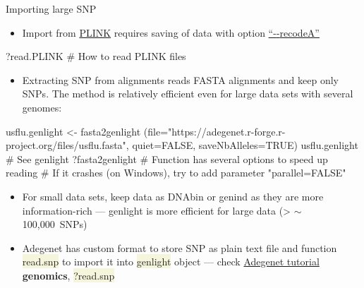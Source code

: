 \documentclass[compress, xelatex, 11pt, xcolor=svgnames, aspectratio=169,
	hyperref={
		bookmarks=true,
		unicode=true,
		colorlinks=true,
		pdftitle={Molecular data in R},
		plainpages=false,
		pdfauthor={Vojtech Zeisek},
		pdfsubject={Course about phylogeny and evolution in R},
		pdfcreator={XeLaTeX},
		pdfkeywords={R, evolution, phylogeny, molecular data},
		linkcolor=Crimson, %
		anchorcolor=Magenta, %
		citecolor=Magenta, %
		filecolor=Magenta, %
		menucolor=Magenta, %
		urlcolor=DodgerBlue, %
		},
	url={hyphens, lowtilde} %
	]{beamer}
\renewcommand{\texttt}[1]{\colorbox{Beige}{{\ttfamily #1}}}
\begin{document}
\begin{frame}[fragile]{Importing large SNP}
	\begin{itemize}
		\item Import from \href{https://zzz.bwh.harvard.edu/plink/index.shtml}{PLINK} requires saving of data with option \href{https://zzz.bwh.harvard.edu/plink/dataman.shtml}{\enquote{-{-}recodeA}}
	\end{itemize}
	\begin{spluscode}
    ?read.PLINK # How to read PLINK files
	\end{spluscode}
	\begin{itemize}
		\item Extracting SNP from alignments reads FASTA alignments and keep only SNPs. The method is relatively efficient even for large data sets with several genomes:
	\end{itemize}
	\begin{spluscode}
    usflu.genlight <- fasta2genlight
      (file="https://adegenet.r-forge.r-project.org/files/usflu.fasta",
      quiet=FALSE, saveNbAlleles=TRUE)
    usflu.genlight # See genlight
    ?fasta2genlight # Function has several options to speed up reading
    # If it crashes (on Windows), try to add parameter "parallel=FALSE"
	\end{spluscode}
	\begin{itemize}
		\item For small data sets, keep data as DNAbin or genind as they are more information-rich --- genlight is more efficient for large data (> $\sim$100,000~SNPs)
		\item Adegenet has custom format to store SNP as plain text file and function \texttt{read.snp} to import it into \texttt{genlight} object --- check \href{https://github.com/thibautjombart/adegenet/wiki/Tutorials}{Adegenet tutorial} \textbf{genomics}, \texttt{?read.snp}
	\end{itemize}
\end{frame}
\end{document}
